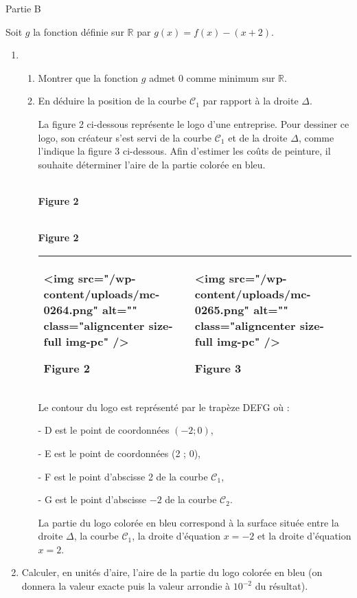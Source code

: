 \begin{h3}Partie B\end{h3}
Soit $g$ la fonction définie sur $\mathbb{R}$ par $g\left(x\right)=f\left(x\right)-\left(x+2\right)$.
\begin{enumerate}
     \item
     \begin{enumerate}
          \item
          Montrer que la fonction $g$ admet $0$ comme minimum sur $\mathbb{R}$.
          \item
          En déduire la position de la courbe $\mathscr C_{1}$ par rapport à la droite $\Delta $.
          \par
          La figure 2 ci-dessous représente le logo d'une entreprise. Pour dessiner ce logo, son créateur s'est servi de la courbe $\mathscr C_{1}$ et de la droite $\Delta $, comme l'indique la figure 3 ci-dessous. Afin d'estimer les coûts de peinture, il souhaite déterminer l'aire de la partie colorée en bleu.
\medskip

\\ \textbf{Figure 2}

\\ \textbf{Figure 2}
          \begin{tabularx}{0.8\linewidth}{|*{3}{>{\centering \arraybackslash }X|}}%
               \hline
               <img src="/wp-content/uploads/mc-0264.png" alt="" class="aligncenter size-full  img-pc" />\begin{center}Figure 2\end{center}  & <img src="/wp-content/uploads/mc-0265.png" alt="" class="aligncenter size-full  img-pc" />\begin{center}Figure 3\end{center}
               \\ \hline
          \end{tabularx}
          Le contour du logo est représenté par le trapèze DEFG où :
          \par
          - D est le point de coordonnées $\left(-2 ; 0\right)$,
          \par
          - E est le point de coordonnées (2 ; 0),
          \par
          - F est le point d'abscisse 2 de la courbe $\mathscr C_{1}$,
          \par
          - G est le point d'abscisse $-2$ de la courbe $\mathscr C_{2}$.
          \par
     La partie du logo colorée en bleu correspond à la surface située entre la droite $\Delta $, la courbe $\mathscr C_{1}$, la droite d'équation $x =-2$ et la droite d'équation $x=2$.\end{enumerate}
     \item
Calculer, en unités d'aire, l'aire de la partie du logo colorée en bleu (on donnera la valeur exacte puis la valeur arrondie à $10^{-2}$ du résultat).\end{enumerate}
